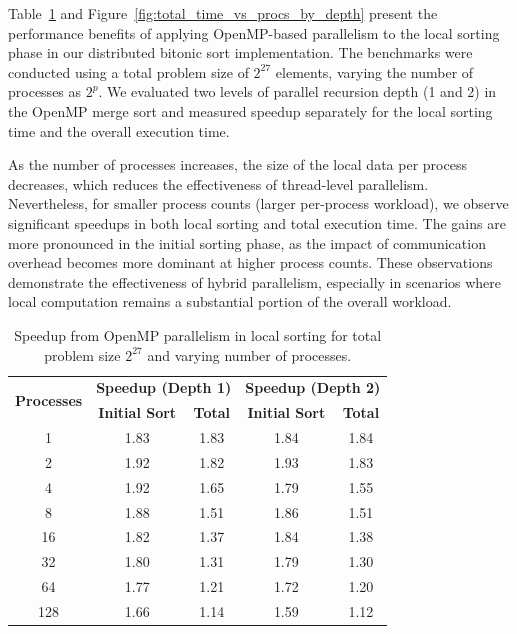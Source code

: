 \documentclass{article}
\begin{document}
Table~\ref{tab:omp_speedup} and Figure~\ref{fig:total_time_vs_procs_by_depth} present the performance benefits 
of applying OpenMP-based parallelism to the local sorting phase in our distributed bitonic sort implementation. 
The benchmarks were conducted using a total problem size of $2^{27}$ elements, varying the number of processes 
as $2^p$. We evaluated two levels of parallel recursion depth (1 and 2) in the OpenMP merge sort and measured 
speedup separately for the local sorting time and the overall execution time.

As the number of processes increases, the size of the local data per process decreases, which reduces the 
effectiveness of thread-level parallelism. Nevertheless, for smaller process counts (larger per-process workload),
we observe significant speedups in both local sorting and total execution time. The gains are more pronounced in 
the initial sorting phase, as the impact of communication overhead becomes more dominant at higher process counts.
These observations demonstrate the effectiveness of hybrid parallelism, especially in scenarios where local 
computation remains a substantial portion of the overall workload.

\begin{table}[h]
\centering
\begin{tabular}{|c|c|c|c|c|}
\hline
\multirow{2}{*}{\textbf{Processes}} & \multicolumn{2}{c|}{\textbf{Speedup (Depth 1)}} & 
\multicolumn{2}{c|}{\textbf{Speedup (Depth 2)}} \\
\cline{2-5}
 & \textbf{Initial Sort} & \textbf{Total} & \textbf{Initial Sort} & \textbf{Total} \\
\hline
1 & 1.83 & 1.83 & 1.84 & 1.84 \\
2 & 1.92 & 1.82 & 1.93 & 1.83 \\
4 & 1.92 & 1.65 & 1.79 & 1.55 \\
8 & 1.88 & 1.51 & 1.86 & 1.51 \\
16 & 1.82 & 1.37 & 1.84 & 1.38 \\
32 & 1.80 & 1.31 & 1.79 & 1.30 \\
64 & 1.77 & 1.21 & 1.72 & 1.20 \\
128 & 1.66 & 1.14 & 1.59 & 1.12 \\
\hline
\end{tabular}
\caption{Speedup from OpenMP parallelism in local sorting for total problem size $2^{27}$ and varying 
number of processes.}
\label{tab:omp_speedup}
\end{table}
\end{document}
